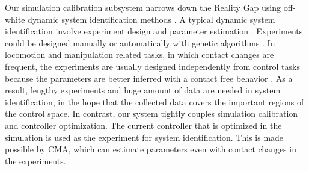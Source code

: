 Our simulation calibration subsystem narrows down the Reality Gap using off-white dynamic system identification methods \cite{ljung:2010}. A typical dynamic system identification involve experiment design and parameter estimation \cite{swevers:2007}. Experiments could be designed manually or automatically with genetic algorithms \cite{BongardL05}. In locomotion and manipulation related tasks, in which contact changes are frequent, the experiments are usually designed independently from control tasks because the parameters are better inferred with a contact free behavior \cite{Kolev:2015}. As a result, lengthy experiments and huge amount of data are needed in system identification, in the hope that the collected data covers the important regions of the control space. In contrast, our system tightly couples simulation calibration and controller optimization. The current controller that is optimized in the simulation is used as the experiment for system identification. This is made possible by CMA, which can estimate parameters even with contact changes in the experiments. 

